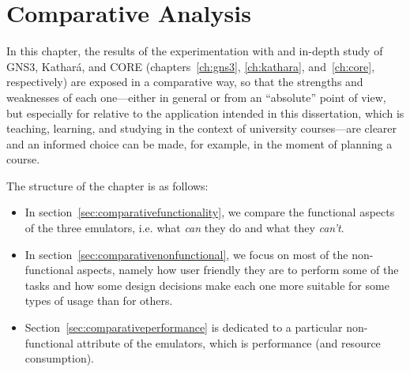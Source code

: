
\chapter{Comparative Analysis}
\label{ch:comparative}

In this chapter, the results of the experimentation with and in-depth study of GNS3, Kathará, and CORE (chapters~\ref{ch:gns3}, \ref{ch:kathara}, and~\ref{ch:core}, respectively) are exposed in a comparative way, so that the strengths and weaknesses of each one---either in general or from an ``absolute'' point of view, but especially for relative to the application intended in this dissertation, which is teaching, learning, and studying in the context of university courses---are clearer and an informed choice can be made, for example, in the moment of planning a course.

The structure of the chapter is as follows:
\begin{itemize}
  \item In section~\ref{sec:comparativefunctionality}, we compare the functional aspects of the three emulators, i.e. what \emph{can} they do and what they \emph{can't}.
  \item In section~\ref{sec:comparativenonfunctional}, we focus on most of the non-functional aspects, namely how user friendly they are to perform some of the tasks and how some design decisions make each one more suitable for some types of usage than for others.
  \item Section~\ref{sec:comparativeperformance} is dedicated to a particular non-functional attribute of the emulators, which is performance (and resource consumption).
\end{itemize}









